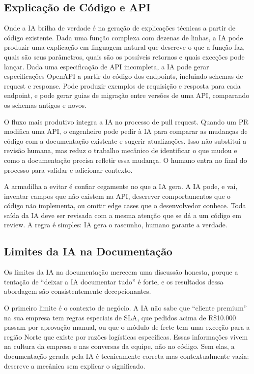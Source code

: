 \subsection{Explicação de Código e API}

Onde a IA brilha de verdade é na geração de explicações técnicas a
partir de código existente. Dada uma função complexa com dezenas de
linhas, a IA pode produzir uma explicação em linguagem natural que
descreve o que a função faz, quais são seus parâmetros, quais são os
possíveis retornos e quais exceções pode lançar. Dada uma especificação
de API incompleta, a IA pode gerar especificações OpenAPI a partir do
código dos endpoints, incluindo schemas de request e response. Pode
produzir exemplos de requisição e resposta para cada endpoint, e pode
gerar guias de migração entre versões de uma API, comparando os
schemas antigos e novos.

O fluxo mais produtivo integra a IA no processo de pull request. Quando
um PR modifica uma API, o engenheiro pode pedir à IA para comparar as
mudanças de código com a documentação existente e sugerir atualizações.
Isso não substitui a revisão humana, mas reduz o trabalho mecânico de
identificar o que mudou e como a documentação precisa refletir essa
mudança. O humano entra no final do processo para validar e adicionar
contexto.

A armadilha a evitar é confiar cegamente no que a IA gera. A IA pode,
e vai, inventar campos que não existem na API, descrever comportamentos
que o código não implementa, ou omitir edge cases que o desenvolvedor
conhece. Toda saída da IA deve ser revisada com a mesma atenção que se
dá a um código em review. A regra é simples: IA gera o rascunho,
humano garante a verdade.


\subsection{Limites da IA na Documentação}

Os limites da IA na documentação merecem uma discussão honesta, porque
a tentação de ``deixar a IA documentar tudo'' é forte, e os
resultados dessa abordagem são consistentemente decepcionantes.

O primeiro limite é o contexto de negócio. A IA não sabe que ``cliente
premium'' na sua empresa tem regras especiais de SLA, que pedidos acima
de R\$10.000 passam por aprovação manual, ou que o módulo de frete tem
uma exceção para a região Norte que existe por razões logísticas
específicas. Essas informações vivem na cultura da empresa e nas
conversas da equipe, não no código. Sem elas, a documentação gerada
pela IA é tecnicamente correta mas contextualmente vazia: descreve
a mecânica sem explicar o significado.


